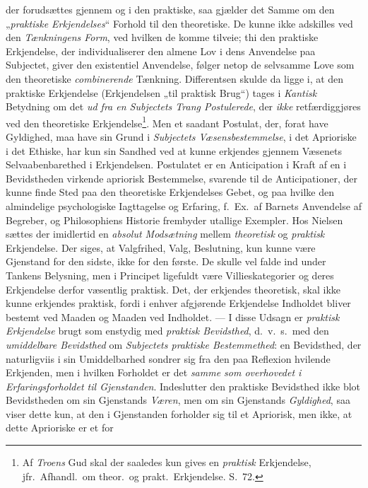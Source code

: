 \documentclass[12pt,a4paper]{book}
\newcommand{\opage}[1]{\marginnote{\footnotesize\textit{[#1]}}}
\begin{document}
der forudsættes gjennem og i den praktiske, saa gjælder det Samme om
den „\emph{praktiske Erkjendelses}“ Forhold til den theoretiske. De kunne
ikke adskilles ved den \emph{Tænkningens Form}, ved hvilken de komme tilveie;
thi den praktiske Erkjendelse, der individualiserer den almene Lov i
dens Anvendelse paa Subjectet, giver den existentiel Anvendelse, følger
netop de selvsamme Love som den theoretiske \emph{combinerende} Tænkning.
Differentsen skulde da ligge i, at den praktiske Erkjendelse
(Erkjendelsen „til praktisk Brug“) tages i \emph{Kantisk} Betydning om det \emph{ud fra en Subjectets Trang Postulerede}, der \emph{ikke} retfærdiggjøres ved
den theoretiske Erkjendelse\footnote{Af \emph{Troens} Gud skal der saaledes kun gives en \emph{praktisk}
Erkjendelse, jfr.\ Afhandl.\ om theor.\ og prakt.\ Erkjendelse. S.\ 72.}. Men et saadant
Postulat, der, forat have
Gyldighed, maa have sin Grund i \emph{Subjectets Væsensbestemmelse}, i det
Aprioriske i det Ethiske, har kun sin Sandhed ved at kunne erkjendes
gjennem Væsenets Selvaabenbarethed i Erkjendelsen. Postulatet er en
Anticipation i Kraft af en i Bevidstheden virkende apriorisk
Bestemmelse, svarende til de Anticipationer, der kunne finde Sted paa
den theoretiske Erkjendelses Gebet, og paa hvilke den almindelige
psychologiske Iagttagelse og Erfaring, f.~Ex.\ af Barnets Anvendelse af
Begreber, og Philosophiens Historie frembyder utallige Exempler. Hos
Nielsen sættes der imidlertid en \emph{absolut Modsætning} mellem \emph{theoretisk}
\opage{148}og \emph{praktisk} Erkjendelse. Der siges, at Valgfrihed, Valg, Beslutning,
kun kunne være Gjenstand for den sidste, ikke for den første. De skulle
vel falde ind under Tankens Belysning, men i Principet ligefuldt være
Villieskategorier og deres Erkjendelse derfor væsentlig praktisk. Det,
der erkjendes theoretisk, skal ikke kunne erkjendes praktisk, fordi i
enhver afgjørende Erkjendelse Indholdet bliver bestemt ved Maaden og
Maaden ved Indholdet. --- I disse Udsagn er \emph{praktisk Erkjendelse} brugt som
enstydig med \emph{praktisk Bevidsthed}, d.~v.~s.\ med den \emph{umiddelbare Bevidsthed} om \emph{Subjectets praktiske Bestemmethed}: en Bevidsthed, der
naturligviis i sin Umiddelbarhed sondrer sig fra den paa Reflexion hvilende Erkjenden, men i hvilken Forholdet er det \emph{samme som overhovedet i Erfaringsforholdet til Gjenstanden}. Indeslutter den praktiske
Bevidsthed ikke blot Bevidstheden om sin Gjenstands \emph{Væren}, men om sin Gjenstands \emph{Gyldighed}, saa viser dette kun, at den i Gjenstanden
forholder sig til et Apriorisk, men ikke, at dette Aprioriske er et for
\end{document}
